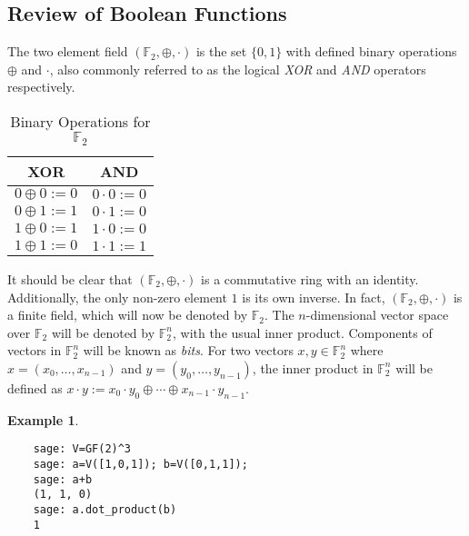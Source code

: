 \documentclass[english]{article}
\def\gftwo{\mathbb{F}_2}
\theoremstyle{plain}
\theoremstyle{definition}
\newtheorem{example}[theorem]{Example}
\theoremstyle{remark}
\begin{document}
\subsection{Review of Boolean Functions}
\par The two element field $(\gftwo,\oplus,\cdot)$ is the set $\{0,1\}$
with defined binary operations $\oplus$ and $\cdot$, also commonly referred
to as the logical {\em XOR} and {\em AND} operators respectively.
\begin{table}[!htbp]
  \centering
  \begin{tabular}{|c|c|}
    \hline
    XOR&AND\\
    \hline
    $0\oplus0:=0$&$0\cdot0:=0$\\
    $0\oplus1:=1$&$0\cdot1:=0$\\
    $1\oplus0:=1$&$1\cdot0:=0$\\
    $1\oplus1:=0$&$1\cdot1:=1$\\
    \hline
  \end{tabular}
  \caption{Binary Operations for $\gftwo$}
  \label{tab:GF(2)}
\end{table}
\par It should be clear that $(\gftwo,\oplus,\cdot)$ is a commutative ring
with an identity. Additionally, the only non-zero element $1$ is its own
inverse. In fact, $(\gftwo,\oplus,\cdot)$ is a finite field, which will now
be denoted by $\gftwo$. The $n$-dimensional vector space over $\gftwo$ will
be denoted by $\gftwo^n$, with the usual inner product. Components of vectors in
$\gftwo^n$ will be known as {\em bits}.
For two vectors $x,y\in\gftwo^n$ where $x=(x_0,\dots,x_{n-1})$ and
$y=(y_0,\dots,y_{n-1})$, the inner product in $\gftwo^n$ will be defined
as $x\cdot y:=\allowbreak x_0\cdot y_0 \oplus\allowbreak
\cdots \oplus\allowbreak x_{n-1}\cdot y_{n-1}$.

\begin{example}
  \ 
  \begin{lstlisting}
    sage: V=GF(2)^3
    sage: a=V([1,0,1]); b=V([0,1,1]);
    sage: a+b
    (1, 1, 0)
    sage: a.dot_product(b)
    1
  \end{lstlisting}
\end{example}
\end{document}
